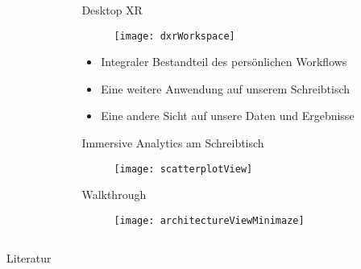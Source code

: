 \documentclass[final,hyperref={pdfpagelabels=false}]{beamer}
\begin{document}
\begin{frame}[t]
\begin{columns}[t]
\begin{column}{.465\textwidth}
\end{column} %

\begin{column}{.03\textwidth}\end{column} %

\begin{column}{.465\textwidth} %

\begin{block}{Desktop XR}

    \begin{figure}
        \centering
        \texttt{[image: dxrWorkspace]}
        \label{fig:disgitaleabgabe}
    \end{figure}

    \begin{itemize}
     \item Integraler Bestandteil des persönlichen Workflows
     \item Eine weitere Anwendung auf unserem Schreibtisch
     \item Eine andere Sicht auf unsere Daten und Ergebnisse
    \end{itemize}
    \vspace{20px}
\end{block}


\begin{block}{Immersive Analytics am Schreibtisch}
    \begin{figure}
        \texttt{[image: scatterplotView]}
    \end{figure}
\end{block}

\vspace{0.5cm}

\begin{block}{Walkthrough}
    \begin{figure}
        \texttt{[image: architectureViewMinimaze]}
    \end{figure}
\end{block}

\vspace{0.1cm}

\end{column} %

\begin{column}{.015\textwidth}\end{column} %

\end{columns} %

\begin{block}{Literatur}
   
   \nocite{pries:19}
  
\end{block}

\end{frame} %
\end{document}
